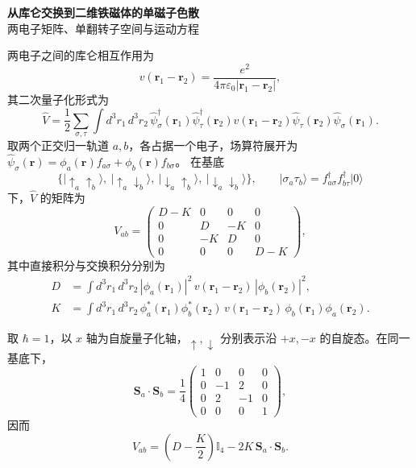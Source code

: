 \documentclass[UTF8,11pt,a4paper,fontset=fandol]{ctexart}
\newcommand{\ket}[1]{\lvert #1\rangle}
\newcommand{\id}{\mathbb I}
\begin{document}
\begin{center}
{\LARGE\bfseries\color{ink}从库仑交换到二维铁磁体的单磁子色散}\\[0.65em]
{\small 两电子矩阵、单翻转子空间与运动方程}
\end{center}
\vspace{0.3em}

两电子之间的库仑相互作用为
\begin{equation}
v(\mathbf r_1-\mathbf r_2)=
\frac{e^2}{4\pi\varepsilon_0|\mathbf r_1-\mathbf r_2|},
\end{equation}
其二次量子化形式为
\begin{equation}
\hat V=\frac12\sum_{\sigma,\tau}
\int d^3r_1\,d^3r_2\,
\hat\psi^\dagger_\sigma(\mathbf r_1)
\hat\psi^\dagger_\tau(\mathbf r_2)
v(\mathbf r_1-\mathbf r_2)
\hat\psi_\tau(\mathbf r_2)\hat\psi_\sigma(\mathbf r_1).
\end{equation}
取两个正交归一轨道 $a,b$，各占据一个电子，场算符展开为
$\hat\psi_\sigma(\mathbf r)=\phi_a(\mathbf r)f_{a\sigma}+\phi_b(\mathbf r)f_{b\sigma}$。
在基底
\begin{equation}
\bigl\{
\ket{\uparrow_a\uparrow_b},\
\ket{\uparrow_a\downarrow_b},\
\ket{\downarrow_a\uparrow_b},\
\ket{\downarrow_a\downarrow_b}
\bigr\},\qquad
\ket{\sigma_a\tau_b}=f^\dagger_{a\sigma}f^\dagger_{b\tau}\ket{0}
\label{eq:pairbasis}
\end{equation}
下，$\hat V$ 的矩阵为
\begin{equation}
V_{ab}=
\begin{pmatrix}
D-K&0&0&0\\
0&D&-K&0\\
0&-K&D&0\\
0&0&0&D-K
\end{pmatrix},
\label{eq:coulombmatrix}
\end{equation}
其中直接积分与交换积分分别为
\begin{align}
D&=\int d^3r_1\,d^3r_2\,
|\phi_a(\mathbf r_1)|^2\,v(\mathbf r_1-\mathbf r_2)\,
|\phi_b(\mathbf r_2)|^2, \label{eq:direct}\\
K&=\int d^3r_1\,d^3r_2\,
\phi_a^*(\mathbf r_1)\phi_b^*(\mathbf r_2)\,
v(\mathbf r_1-\mathbf r_2)\,
\phi_b(\mathbf r_1)\phi_a(\mathbf r_2). \label{eq:exchange}
\end{align}

取 $\hbar=1$，以 $x$ 轴为自旋量子化轴，$\uparrow,\downarrow$ 分别表示沿 $+x,-x$ 的自旋态。在同一基底下，
\begin{equation}
\mathbf S_a\cdot\mathbf S_b
=\frac14
\begin{pmatrix}
1&0&0&0\\
0&-1&2&0\\
0&2&-1&0\\
0&0&0&1
\end{pmatrix},
\label{eq:dotmatrix}
\end{equation}
因而
\begin{equation}
\boxed{
V_{ab}=\left(D-\frac K2\right)\id_4
-2K\,\mathbf S_a\cdot\mathbf S_b.
}
\label{eq:pairspin}
\end{equation}
\end{document}
